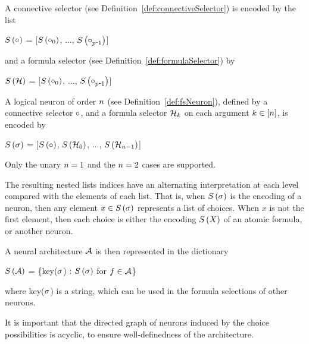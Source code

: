 A connective selector (see Definition~\ref{def:connectiveSelector}) is encoded by the list
	\begin{centeredcode}
			$S\left(\circ\right)$ 
			= [$S\left(\circ_{0}\right)$, $\ldots$, $\synencodingof{\exconnective_{\parlegdim\shortminus1}}$]
	\end{centeredcode}
and a formula selector (see Definition~\ref{def:formulaSelector}) by
	\begin{centeredcode}
			$S\left(\mathcal{H}\right)$ 
			= [$S\left(\circ_{0}\right)$, $\ldots$, $\synencodingof{\exconnective_{\parlegdim\shortminus1}}$]
	\end{centeredcode}
A logical neuron of order $n$ (see Definition~\ref{def:fsNeuron}), defined by a connective selector $\circ$, and a formula selector $\mathcal{H}_k$ on each argument $k\in[n]$, is encoded by
		\begin{centeredcode}
			$S\left(\sigma\right)$ 
			= [$S\left(\circ\right)$, $S\left(\mathcal{H}_0\right)$, $\ldots$,  $S\left(\mathcal{H}_{n-1}\right)$]
		\end{centeredcode}
Only the unary $n=1$ and the $n=2$ cases are supported.


The resulting nested lists indices have an alternating interpretation at each level compared with the elements of each list.
That is, when $S\left(\sigma\right)$ is the encoding of a neuron, then any element $x\in S\left(\sigma\right)$ represents a list of choices.
When $x$ is not the first element, then each choice is either the encoding $S\left(X\right)$ of an atomic formula, or another neuron. 

A neural architecture $\mathcal{A}$ is then represented in the dictionary
\begin{centeredcode}
	$S\left(\mathcal{A}\right)$ = \{key($\sigma$) : $S\left(\sigma\right)$ for $f\in\mathcal{A}$\}
\end{centeredcode}
where key($\sigma$) is a string, which can be used in the formula selections of other neurons.

It is important that the directed graph of neurons induced by the choice possibilities is acyclic, to ensure well-definedness of the architecture.


